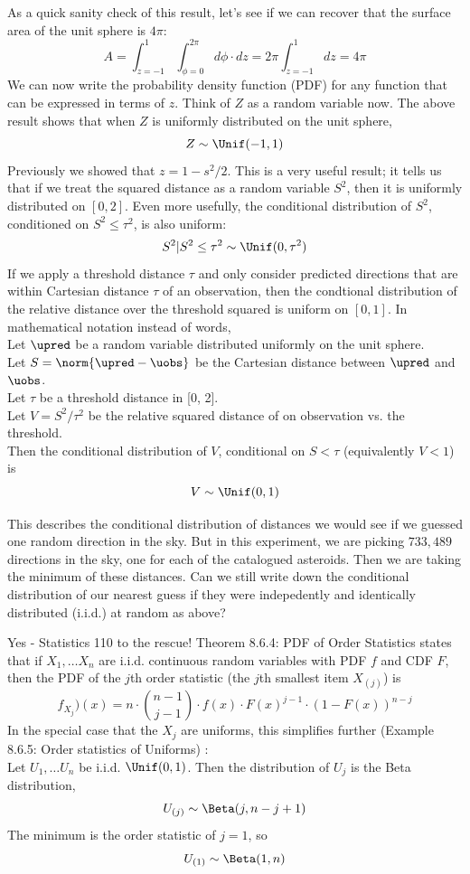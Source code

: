 As a quick sanity check of this result, let's see if we can recover that the surface area of  the unit sphere is $4 \pi$:
$$ A = \int_{z = -1}^{1} \int_{\phi=0}^{2 \pi} d \phi \cdot dz = 2 \pi \int_{z = -1}^{1} dz = 4 \pi$$
We can now write the probability density function (PDF) for any function that can be expressed in terms of $z$.
Think of $Z$ as a random variable now.  The above result shows that when $Z$ is uniformly distributed on the unit sphere,
$$Z \sim \Unif(-1, 1)$$
Previously we showed that $z = 1 - s^2 / 2$.
This is a very useful result; it tells us that if we treat the squared distance as a random variable $S^2$, then it is uniformly distributed on $[0, 2]$.
Even more usefully, the conditional distribution of $S^2$, conditioned on $S^2 \le \tau^2$, is also uniform:
$$ S^2 | S^2 \le \tau^2 \sim \Unif(0, \tau^2)$$
If we apply a threshold distance $\tau$ and only consider predicted directions that are within Cartesian distance $\tau$ of an observation,
then the condtional distribution of the relative distance over the threshold squared is uniform on $[0, 1]$.
In mathematical notation instead of words, \\ 
Let $\upred$ be a random variable distributed uniformly on the unit sphere.\\
Let $S = \norm{\upred - \uobs}$ be the Cartesian distance between $\upred$ and $\uobs$. \\
Let $\tau$ be a threshold distance in [0, 2].\\
Let $V = S^2 / \tau^2$ be the relative squared distance of on observation vs. the threshold.\\
Then the conditional distribution of $V$, conditional on $S < \tau$ (equivalently $V < 1$) is
$$V \sim \Unif(0, 1)$$

This describes the conditional distribution of distances we would see if we guessed one random direction in the sky.
But in this experiment, we are picking $733,489$ directions in the sky, one for each of the catalogued asteroids.
Then we are taking the minimum of these distances.
Can we still write down the conditional distribution of our nearest guess 
if they were indepedently and identically distributed (i.i.d.) at random as above?

Yes - Statistics 110 to the rescue!
Theorem 8.6.4: PDF of Order Statistics \cite{BH} states that if $X_1, \ldots X_n$ are i.i.d. continuous random variables
with PDF $f$ and CDF $F$, then the PDF of the $j$th order statistic (the $j$th smallest item $X_{(j)}$) is
$$f_{X_{j}})(x) = n \cdot {{n-1}\choose{j-1}} \cdot f(x) \cdot F(x)^{j-1} \cdot (1 - F(x))^{n-j}$$
In the special case that the $X_j$ are uniforms, this simplifies further (Example 8.6.5: Order statistics of Uniforms) \cite{BH}:\\
Let $U_1, \ldots U_n$ be i.i.d. $\Unif(0,1)$.
Then the distribution of $U_{j}$ is the Beta distribution,
$$U_{(j)} \sim \Beta(j, n-j+1)$$
The minimum is the order statistic of $j=1$, so
$$U_{(1)} \sim \Beta(1, n)$$ 

